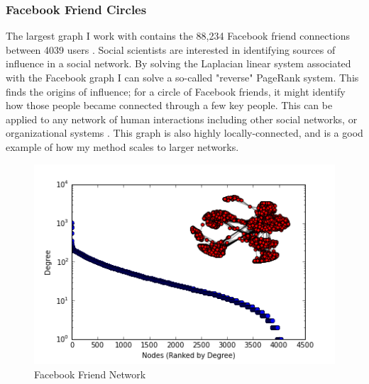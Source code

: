 \documentclass{article}
\begin{document}
\subsubsection{Facebook Friend Circles}
The largest graph I work with contains the 88,234 Facebook friend connections between 4039 users  \cite{Mcauley:2012}. Social scientists are interested in identifying sources of influence in a social network. By solving the Laplacian linear system associated with the Facebook graph I can solve a so-called "reverse" PageRank system. This finds the origins of influence; for a circle of Facebook friends, it might identify how those people became connected through a few key people. This can be applied to any network of human interactions including other social networks, or organizational systems \cite{Gleich:2015}. This graph is also highly locally-connected, and is a good example of how my method scales to larger networks.

\begin{figure}
\centering

\includegraphics[width=\linewidth]{fb_degree_histogram.png}
\caption{Facebook Friend Network}
  
\end{figure}
\end{document}
